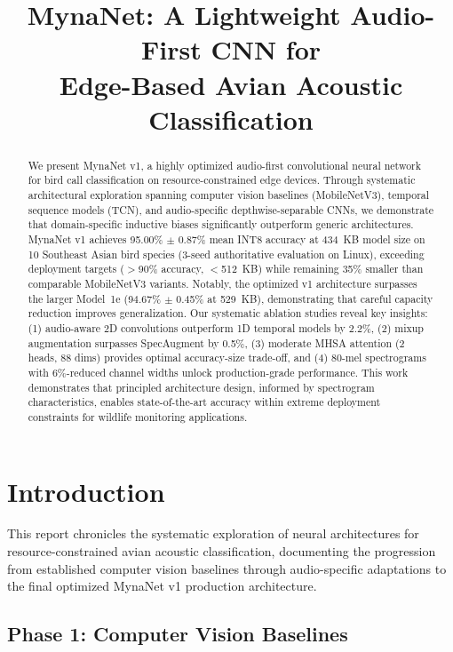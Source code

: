 \documentclass[conference]{IEEEtran}
\title{MynaNet: A Lightweight Audio-First CNN for\\Edge-Based Avian Acoustic Classification}
\author{
\IEEEauthorblockN{Muhammad Mun'im Ahmad Zabidi}
\IEEEauthorblockA{Universiti Malaya\\
Email: mzabidi@gmail.com}
}
\begin{document}
\maketitle

\begin{abstract}
We present MynaNet v1, a highly optimized audio-first convolutional neural network for bird call classification on resource-constrained edge devices. Through systematic architectural exploration spanning computer vision baselines (MobileNetV3), temporal sequence models (TCN), and audio-specific depthwise-separable CNNs, we demonstrate that domain-specific inductive biases significantly outperform generic architectures. MynaNet v1 achieves 95.00\% $\pm$ 0.87\% mean INT8 accuracy at 434~KB model size on 10 Southeast Asian bird species (3-seed authoritative evaluation on Linux), exceeding deployment targets ($>$90\% accuracy, $<$512~KB) while remaining 35\% smaller than comparable MobileNetV3 variants. Notably, the optimized v1 architecture surpasses the larger Model~1e (94.67\% $\pm$ 0.45\% at 529~KB), demonstrating that careful capacity reduction improves generalization. Our systematic ablation studies reveal key insights: (1) audio-aware 2D convolutions outperform 1D temporal models by 2.2\%, (2) mixup augmentation surpasses SpecAugment by 0.5\%, (3) moderate MHSA attention (2 heads, 88 dims) provides optimal accuracy-size trade-off, and (4) 80-mel spectrograms with 6\%-reduced channel widths unlock production-grade performance. This work demonstrates that principled architecture design, informed by spectrogram characteristics, enables state-of-the-art accuracy within extreme deployment constraints for wildlife monitoring applications.
\end{abstract}

\section{Introduction}
\label{sec:introduction}

This report chronicles the systematic exploration of neural architectures for resource-constrained avian acoustic classification, documenting the progression from established computer vision baselines through audio-specific adaptations to the final optimized MynaNet v1 production architecture.

\subsection{Phase 1: Computer Vision Baselines}
\label{sec:phase1}
\end{document}
